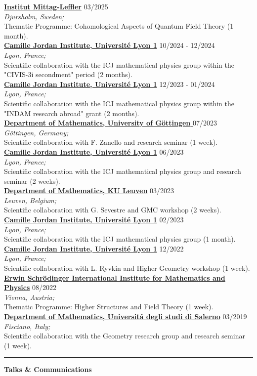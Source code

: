 \documentclass[a4paper]{article}
\newcommand{\block}[1]{\hrule \vspace{0.2cm} \textbf{\Large #1} \vspace{0.2cm}}
\newcommand{\voice}[5]{\href{#4}{\textbf{#1}} \hfill #2 \\ \textit{#3} \\ {\small #5} \vspace{0.2cm} \\}
\begin{document}
	\voice{Institut Mittag-Leffler}
		{03/2025}
		{Djursholm, Sweden;}
		{https://www.mittag-leffler.se/activities/cohomological-aspects-of-quantum-field-theory/}     
		{Thematic Programme: Cohomological Aspects of Quantum Field Theory (1 month).}
	\voice{Camille Jordan Institute, Université Lyon 1}
		{10/2024 - 12/2024}
		{Lyon, France;}
		{None}       
		{Scientific collaboration with the ICJ mathematical physics group within the "CIVIS-3i secondment" period (2 months).}
	\voice{Camille Jordan Institute, Université Lyon 1}
		{12/2023 - 01/2024}
		{Lyon, France;}
		{None}       
		{Scientific collaboration with the ICJ mathematical physics group within the "INDAM research abroad" grant (2 months).}
	\voice{Department of Mathematics, University of Göttingen }
		{07/2023}
		{Göttingen, Germany;}
		{None}       
		{Scientific collaboration with F. Zanello and research seminar (1 week).}
	\voice{Camille Jordan Institute, Université Lyon 1}
		{06/2023}
		{Lyon, France;}
		{None}       
		{Scientific collaboration with the ICJ mathematical physics group and research seminar (2 weeks).}
	\voice{Department of Mathematics, KU Leuven}
		{03/2023}
		{Leuven, Belgium;}
		{None}       
		{Scientific collaboration with G. Sevestre and GMC workshop (2 weeks).}
	\voice{Camille Jordan Institute, Université Lyon 1}
		{02/2023}
		{Lyon, France;}
		{None}       
		{Scientific collaboration with the ICJ mathematical physics group (1 month).}
	\voice{Camille Jordan Institute, Université Lyon 1}
		{12/2022}
		{Lyon, France;}
		{None}       
		{Scientific collaboration with L. Ryvkin and Higher Geometry workshop (1 week).}
	\voice{Erwin Schrödinger International Institute for Mathematics and Physics}
		{08/2022}
		{Vienna, Austria;}
		{https://www.esi.ac.at/events/e430/}       
		{Thematic Programme: Higher Structures and Field Theory (1 week).}
	\voice{Department of Mathematics, Universit\'a degli studi di Salerno}
		{03/2019}
		{Fisciano, Italy;}
		{http://geometria.dipmat.unisa.it/events.html}       
		{Scientific collaboration with the Geometry research group and research seminar (1 week).}

	\block{Talks \& Communications}
\end{document}
